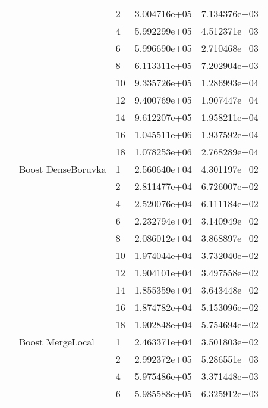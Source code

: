 \begin{tabular}{lllrr}
                      &            & 2  &  3.004716e+05 &  7.134376e+03 \\
                      &            & 4  &  5.992299e+05 &  4.512371e+03 \\
                      &            & 6  &  5.996690e+05 &  2.710468e+03 \\
                      &            & 8  &  6.113311e+05 &  7.202904e+03 \\
                      &            & 10 &  9.335726e+05 &  1.286993e+04 \\
                      &            & 12 &  9.400769e+05 &  1.907447e+04 \\
                      &            & 14 &  9.612207e+05 &  1.958211e+04 \\
                      &            & 16 &  1.045511e+06 &  1.937592e+04 \\
                      &            & 18 &  1.078253e+06 &  2.768289e+04 \\
                      & Boost DenseBoruvka & 1  &  2.560640e+04 &  4.301197e+02 \\
                      &            & 2  &  2.811477e+04 &  6.726007e+02 \\
                      &            & 4  &  2.520076e+04 &  6.111184e+02 \\
                      &            & 6  &  2.232794e+04 &  3.140949e+02 \\
                      &            & 8  &  2.086012e+04 &  3.868897e+02 \\
                      &            & 10 &  1.974044e+04 &  3.732040e+02 \\
                      &            & 12 &  1.904101e+04 &  3.497558e+02 \\
                      &            & 14 &  1.855359e+04 &  3.643448e+02 \\
                      &            & 16 &  1.874782e+04 &  5.153096e+02 \\
                      &            & 18 &  1.902848e+04 &  5.754694e+02 \\
                      & Boost MergeLocal & 1  &  2.463371e+04 &  3.501803e+02 \\
                      &            & 2  &  2.992372e+05 &  5.286551e+03 \\
                      &            & 4  &  5.975486e+05 &  3.371448e+03 \\
                      &            & 6  &  5.985588e+05 &  6.325912e+03 \\

\end{tabular}
